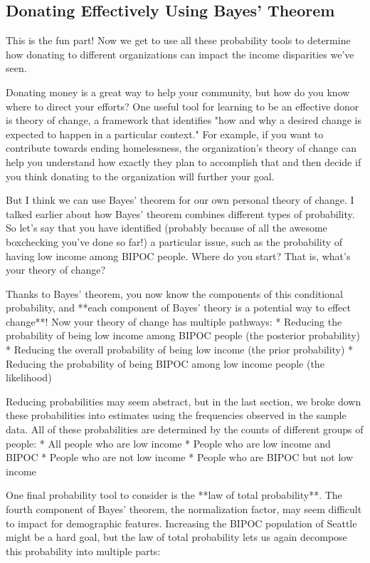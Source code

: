 \documentclass[12pt]{article}
\begin{document}
\subsection*{Donating Effectively Using Bayes' Theorem}

This is the fun part! Now we get to use all these probability tools to determine how donating to different organizations can impact the income disparities we've seen. 

Donating money is a great way to help your community, but how do you know where to direct your efforts? One useful tool for learning to be an effective donor is theory of change, a framework that identifies "how and why a desired change is expected to happen in a particular context."\cite{effphil}\cite{theorychange} For example, if you want to contribute towards ending homelessness, the organization's theory of change can help you understand how exactly they plan to accomplish that and then decide if you think donating to the organization will further your goal.

But I think we can use Bayes' theorem for our own personal theory of change. I talked earlier about how Bayes' theorem combines different types of probability. So let's say that you have identified (probably because of all the awesome boxchecking you've done so far!) a particular issue, such as the probability of having low income among BIPOC people. Where do you start? That is, what's your theory of change?

Thanks to Bayes' theorem, you now know the components of this conditional probability, and **each component of Bayes' theory is a potential way to effect change**! Now your theory of change has multiple pathways:
* Reducing the probability of being low income among BIPOC people (the posterior probability)
* Reducing the overall probability of being low income (the prior probability)
* Reducing the probability of being BIPOC among low income people (the likelihood)

Reducing probabilities may seem abstract, but in the last section, we broke down these probabilities into estimates using the frequencies observed in the sample data. All of these probabilities are determined by the counts of different groups of people:
* All people who are low income
* People who are low income and BIPOC
* People who are not low income
* People who are BIPOC but not low income

One final probability tool to consider is the **law of total probability**. The fourth component of Bayes' theorem, the normalization factor, may seem difficult to impact for demographic features. Increasing the BIPOC population of Seattle might be a hard goal, but the law of total probability lets us again decompose this probability into multiple parts:
\end{document}
